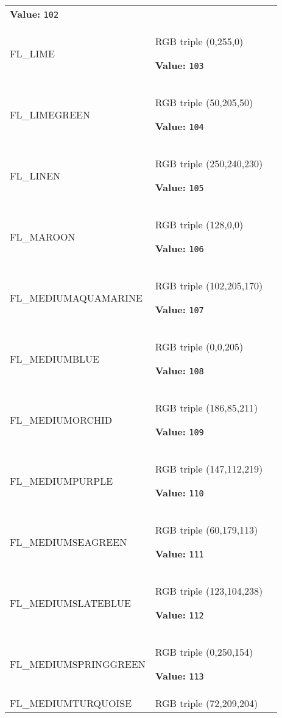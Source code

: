 \begin{longtable}{|p{\varnamewidth}|p{\vardescrwidth}|l}
\textbf{Value:} 
{\tt 102}&\\
\cline{1-2}
\raggedright F\-L\-\_\-L\-I\-M\-E\- & \raggedright RGB triple (0,255,0)

\textbf{Value:} 
{\tt 103}&\\
\cline{1-2}
\raggedright F\-L\-\_\-L\-I\-M\-E\-G\-R\-E\-E\-N\- & \raggedright RGB triple (50,205,50)

\textbf{Value:} 
{\tt 104}&\\
\cline{1-2}
\raggedright F\-L\-\_\-L\-I\-N\-E\-N\- & \raggedright RGB triple (250,240,230)

\textbf{Value:} 
{\tt 105}&\\
\cline{1-2}
\raggedright F\-L\-\_\-M\-A\-R\-O\-O\-N\- & \raggedright RGB triple (128,0,0)

\textbf{Value:} 
{\tt 106}&\\
\cline{1-2}
\raggedright F\-L\-\_\-M\-E\-D\-I\-U\-M\-A\-Q\-U\-A\-M\-A\-R\-I\-N\-E\- & \raggedright RGB triple (102,205,170)

\textbf{Value:} 
{\tt 107}&\\
\cline{1-2}
\raggedright F\-L\-\_\-M\-E\-D\-I\-U\-M\-B\-L\-U\-E\- & \raggedright RGB triple (0,0,205)

\textbf{Value:} 
{\tt 108}&\\
\cline{1-2}
\raggedright F\-L\-\_\-M\-E\-D\-I\-U\-M\-O\-R\-C\-H\-I\-D\- & \raggedright RGB triple (186,85,211)

\textbf{Value:} 
{\tt 109}&\\
\cline{1-2}
\raggedright F\-L\-\_\-M\-E\-D\-I\-U\-M\-P\-U\-R\-P\-L\-E\- & \raggedright RGB triple (147,112,219)

\textbf{Value:} 
{\tt 110}&\\
\cline{1-2}
\raggedright F\-L\-\_\-M\-E\-D\-I\-U\-M\-S\-E\-A\-G\-R\-E\-E\-N\- & \raggedright RGB triple (60,179,113)

\textbf{Value:} 
{\tt 111}&\\
\cline{1-2}
\raggedright F\-L\-\_\-M\-E\-D\-I\-U\-M\-S\-L\-A\-T\-E\-B\-L\-U\-E\- & \raggedright RGB triple (123,104,238)

\textbf{Value:} 
{\tt 112}&\\
\cline{1-2}
\raggedright F\-L\-\_\-M\-E\-D\-I\-U\-M\-S\-P\-R\-I\-N\-G\-G\-R\-E\-E\-N\- & \raggedright RGB triple (0,250,154)

\textbf{Value:} 
{\tt 113}&\\
\cline{1-2}
\raggedright F\-L\-\_\-M\-E\-D\-I\-U\-M\-T\-U\-R\-Q\-U\-O\-I\-S\-E\- & \raggedright RGB triple (72,209,204)


\end{longtable}
